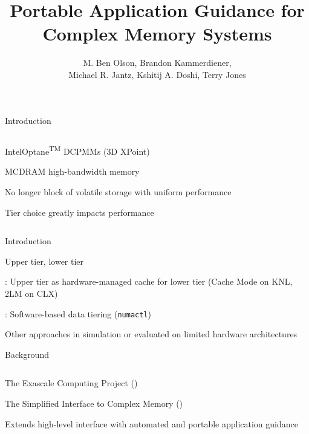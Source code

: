 \documentclass[final,hyperref={pdfpagelabels=false}]{beamer}
\title{Portable Application Guidance for Complex Memory Systems}
\author{M. Ben Olson, Brandon Kammerdiener,\\Michael R. Jantz, Kshitij A. Doshi, Terry Jones}
\begin{document}
\begin{frame}
  \maketitle
\end{frame}

\begin{frame}{Introduction}
\begin{minipage}{\paperwidth}
\begin{columns}[T,onlytextwidth]%
%
  \begin{customlist}{0em}{0em}
    \item Intel\textregistered Optane\textsuperscript{TM} DCPMMs (3D XPoint)
    \item MCDRAM high-bandwidth memory
    \item No longer block of volatile storage with uniform performance
    \item Tier choice greatly impacts performance
  \end{customlist}
%
  \resizebox{.85\textwidth}{!}{%
    
  }
\end{columns}
\end{minipage}
\end{frame}

\begin{frame}{Introduction}
  \begin{customlist}{0em}{0em}
    \item Upper tier, lower tier
    \item {}: Upper
      tier as hardware-managed cache for lower tier (Cache Mode on KNL, 2LM on CLX)
    \item {}:
      Software-based data tiering (\texttt{numactl})
    \item Other approaches in simulation or evaluated on limited hardware architectures
  \end{customlist}
\end{frame}

\begin{frame}{Background}
  \begin{columns}[T,onlytextwidth]%
    \resizebox{.9\textwidth}{!}{%
      
    }
    \begin{customlist}{0em}{0em}
      \item The Exascale Computing Project ()
      \item The Simplified Interface to Complex Memory ()
      \item Extends high-level interface with automated and portable application
        guidance
    \end{customlist}
  \end{columns}
\end{frame}
\end{document}
